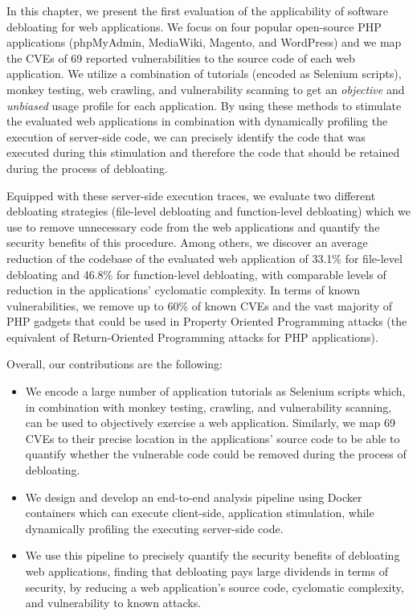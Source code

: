 In this chapter, we present the first evaluation of the applicability of software
debloating for web applications. We focus on four popular open-source PHP
applications (phpMyAdmin, MediaWiki, Magento, and WordPress) and we map the CVEs of 69
reported vulnerabilities to the source code of each web application. We utilize
a combination of tutorials (encoded as Selenium scripts), monkey testing,
web crawling, and vulnerability scanning to get an \emph{objective} and \emph{
unbiased} usage profile for each application. By using
these methods to stimulate the evaluated web applications in combination with
dynamically profiling the execution of server-side code, we can precisely
identify the code that was executed during this stimulation and therefore
the code that should be retained during the process of debloating.

Equipped with these server-side execution traces, we evaluate two different
debloating strategies (file-level debloating and function-level debloating)
which we use to remove unnecessary code from the web applications and quantify
the security benefits of this procedure. Among others, we discover an average
reduction of the codebase of the evaluated web application of 33.1\% for
file-level debloating and 46.8\% for function-level debloating, with comparable
levels of reduction in the applications' cyclomatic complexity.
In terms of
known vulnerabilities, we remove up to 60\% of known CVEs and the vast majority
of PHP gadgets that could be used in Property Oriented Programming attacks
(the equivalent of Return-Oriented Programming attacks for PHP applications).

\noindent Overall, our contributions are the following:

\begin{itemize}
  \setlength\itemsep{0.5em}
\item We encode a large number of application tutorials as Selenium scripts which, in combination with monkey testing, crawling, and vulnerability scanning, can be used to objectively exercise a web application. Similarly, we map 69 CVEs to their precise location in the applications' source code to be able to quantify whether the vulnerable code could be removed during the process of debloating.

\item We design and develop an end-to-end analysis pipeline using Docker containers which can execute client-side, application stimulation, while dynamically profiling the executing server-side code.

\item We use this pipeline to precisely quantify the security benefits of debloating web applications, finding that debloating pays large dividends in terms of security, by reducing a web application's source code, cyclomatic complexity, and vulnerability to known attacks.

\end{itemize}


